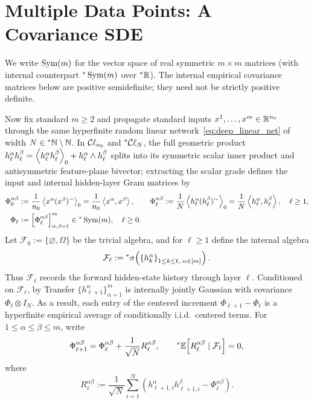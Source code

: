 \section{Multiple Data Points: A Covariance SDE}\label{sec:multi_cov_sde}

We write $\operatorname{Sym}(m)$ for the vector space of real symmetric $m \times m$ matrices (with internal counterpart ${}^*\operatorname{Sym}(m)$ over ${}^*\mathbb{R}$). The internal empirical covariance matrices below are positive semidefinite; they need not be strictly positive definite.

Now fix standard $m \ge 2$ and propagate standard inputs $x^1, \dots, x^m \in \mathbb{R}^{n_0}$ through the same hyperfinite random linear network~\eqref{eq:deep_linear_net} of width $N \in {}^*\mathbb{N} \setminus \mathbb{N}$. In $\mathcal{C}\ell_{n_0}$ and ${}^*\mathcal{C}\ell_N$, the full geometric product $h_\ell^\alpha h_\ell^\beta = \left\langle h_\ell^\alpha h_\ell^\beta \right\rangle_0 + h_\ell^\alpha \wedge h_\ell^\beta$ splits into its symmetric scalar inner product and antisymmetric feature-plane bivector; extracting the scalar grade defines the input and internal hidden-layer Gram matrices by
\begin{equation}\label{eq:multi_linear_gram}
\begin{aligned}
\Phi_0^{\alpha\beta} &:= \frac{1}{n_0}\left\langle x^\alpha(x^\beta)^{\sim} \right\rangle_0 = \frac{1}{n_0}\left\langle x^\alpha, x^\beta \right\rangle, \qquad \Phi_\ell^{\alpha\beta} := \frac{1}{N}\left\langle h_\ell^\alpha(h_\ell^\beta)^{\sim} \right\rangle_0 = \frac{1}{N}\left\langle h_\ell^\alpha, h_\ell^\beta \right\rangle, \quad \ell \ge 1, \\
\Phi_\ell &:= \left[\Phi_\ell^{\alpha\beta}\right]_{\alpha,\beta=1}^m \in {}^*\operatorname{Sym}(m), \quad \ell \ge 0.
\end{aligned}
\end{equation}
Let $\mathcal{F}_0 := \{\varnothing, \Omega\}$ be the trivial algebra, and for $\ell \ge 1$ define the internal algebra
\begin{equation}\label{eq:internal_filtration}
\mathcal{F}_\ell := {}^*\sigma\!\left(\left\{h_k^\alpha\right\}_{1 \le k \le \ell,\; \alpha \in [m]}\right).
\end{equation}
Thus $\mathcal{F}_\ell$ records the forward hidden-state history through layer $\ell$. Conditioned on $\mathcal{F}_\ell$, by Transfer $\{h_{\ell+1}^\alpha\}_{\alpha=1}^m$ is internally jointly Gaussian with covariance $\Phi_\ell \otimes I_N$. As a result, each entry of the centered increment $\Phi_{\ell+1} - \Phi_\ell$ is a hyperfinite empirical average of conditionally i.i.d.\ centered terms. For $1 \le \alpha \le \beta \le m$, write
\begin{equation}\label{eq:gram_inc_decomp}
\Phi_{\ell+1}^{\alpha\beta} = \Phi_\ell^{\alpha\beta} + \frac{1}{\sqrt{N}} R_\ell^{\alpha\beta}, \qquad {}^*\mathbb{E}\!\left[R_\ell^{\alpha\beta} \mid \mathcal{F}_\ell\right] = 0,
\end{equation}
where
\begin{equation}\label{eq:gram_fluct_R}
R_\ell^{\alpha\beta} := \frac{1}{\sqrt{N}} \sum_{i=1}^N \left(h_{\ell+1,i}^\alpha h_{\ell+1,i}^\beta - \Phi_\ell^{\alpha\beta}\right).
\end{equation}

